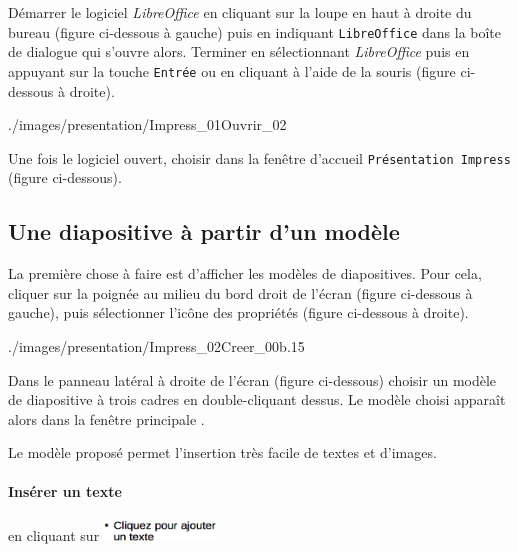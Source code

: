 Démarrer le logiciel \emph{LibreOffice} en cliquant sur la loupe en haut à droite du bureau (figure ci-dessous à gauche) puis en indiquant \texttt{LibreOffice} dans la boîte de dialogue qui s'ouvre alors. Terminer en sélectionnant \emph{LibreOffice} puis en appuyant sur la touche \texttt{Entrée} ou en cliquant à l'aide de la souris (figure ci-dessous à droite).

              {./images/presentation/Impress_01Ouvrir_02}{\textwidth}

Une fois le logiciel ouvert, choisir dans la fenêtre d'accueil \texttt{Présentation Impress} (figure ci-dessous).












\subsection{Une diapositive à partir d'un modèle}\label{Presentation1diapoModele}

La première chose à faire est d'afficher les modèles de diapositives. Pour cela, cliquer sur la poignée au milieu du bord droit de l'écran (figure ci-dessous à gauche), puis sélectionner l'icône des propriétés (figure ci-dessous à droite).

	      {./images/presentation/Impress_02Creer_00b}{.15\textwidth}

Dans le panneau latéral à droite de l'écran (figure ci-dessous) choisir un modèle de diapositive à trois cadres  en double-cliquant dessus. Le modèle choisi apparaît alors dans la fenêtre principale . 


Le modèle proposé permet l'insertion très facile de textes et d'images.


\paragraph{Insérer un texte} en cliquant sur \includegraphics[width=3cm]{./images/presentation/Impress_02Creer_04}


